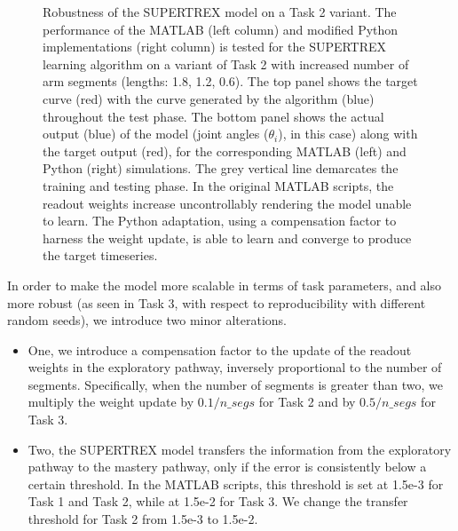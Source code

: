 \begin{figure}
\begin{subfigure}{\textwidth}
    \end{subfigure}
        
            



\caption{Robustness of the SUPERTREX model on a Task 2 variant. The performance of the MATLAB (left column) and modified Python implementations (right column) is tested for the SUPERTREX learning algorithm on a variant of Task 2 with increased number of arm segments (lengths: 1.8, 1.2, 0.6). The top panel shows the target curve (red) with the curve generated by the algorithm (blue) throughout the test phase. The bottom panel shows the actual output (blue) of the model (joint angles  ($\theta_i$), in this case) along with the target output (red), for the corresponding MATLAB (left) and Python (right) simulations. The grey vertical line demarcates the training and testing phase. In the original MATLAB scripts, the readout weights increase uncontrollably rendering the model unable to learn. The Python adaptation, using  a compensation factor to harness the weight update, is able to learn and converge to produce the target timeseries.}
\label{Fig:Comparison_Task2_Seg3}

\end{figure}


In order to make the model more scalable in terms of task parameters, and also more robust (as seen in Task 3, with respect to reproducibility with different random seeds), we introduce two minor alterations.

\begin{itemize}
    \item One, we introduce a compensation factor to the update of the readout weights in the exploratory pathway, inversely proportional to the number of segments. Specifically, when the number of segments is greater than two, we multiply the weight update by $0.1/n\_segs$ for Task 2 and by $0.5/n\_segs$ for Task 3.
    \item Two, the SUPERTREX model transfers the information from the exploratory pathway to the mastery pathway, only if the error is consistently below a certain threshold. In the MATLAB scripts, this threshold is set at 1.5e-3 for Task 1 and Task 2, while at 1.5e-2 for Task 3. We change the transfer threshold for Task 2 from 1.5e-3 to 1.5e-2. 
\end{itemize}

